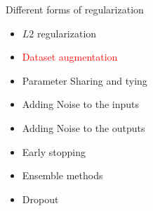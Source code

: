 \begin{frame}
\end{frame}

\begin{frame}
\vspace{4em}
	\begin{overlayarea}{\textwidth}{\textheight}
		\begin{block}{Different forms of regularization}
			\begin{itemize}
				\item $L2$ regularization
				\item \textcolor<2->{red}{Dataset augmentation}
				\item Parameter Sharing and tying
				\item Adding Noise to the inputs 
				\item Adding Noise to the outputs 
				\item Early stopping
				\item Ensemble methods
				\item Dropout
			\end{itemize}
		\end{block}
	\end{overlayarea}
\end{frame}
\begin{frame}
	\begin{columns}
		\begin{center}
			
		\end{center}
					
	\end{columns}    
\end{frame}
		
